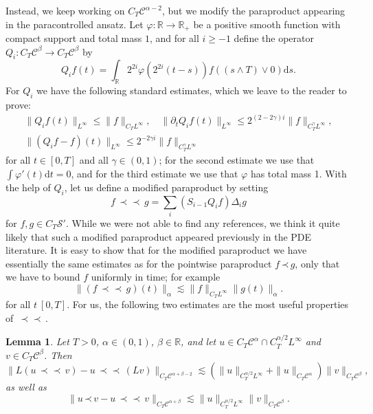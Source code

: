 \documentclass[a4paper,11pt]{article}
\newcommand{\mathd}{\mathrm{d}}
\newtheorem{lemma}[theorem]{Lemma}
\theoremstyle{remark}
\newcommand{\R}{\mathbb{R}}
\newcommand{\CC}{\ensuremath{\mathscr{C}}}
\newcommand{\CS}{\ensuremath{\mathscr{S}}}
\newcommand{\lpara}{\,\mathord{\prec}\,}
\newcommand{\mpara}{\,\mathord{\prec\!\!\!\prec}\,}
\begin{document}
Instead, we keep working on $C_{T} \CC^{\alpha -2}$, but we modify the paraproduct
appearing in the paracontrolled ansatz. Let $\varphi \colon \mathbb{R} \rightarrow \mathbb{R}_{+}$ be a positive smooth function with compact support and total
mass $1$, and for all $i \geqslant -1$ define the operator $Q_{i} \colon C_{T} \CC^{\beta} \rightarrow C_{T} \CC^{\beta}$ by
\[
   Q_{i} f ( t ) = \int_{\mathbb{R}} 2^{2i} \varphi ( 2^{2i} ( t-s ) ) f ( (s \wedge T ) \vee 0 ) \mathd s.
\]
For $Q_{i}$ we have the following standard estimates, which we leave to the reader to prove:
\begin{gather}\label{eq:Q-bounds}
   \| Q_{i} f ( t ) \|_{L^{\infty}} \leqslant \| f \|_{C_{T} L^{\infty}} , \hspace{1em} \| \partial_{t} Q_{i} f ( t ) \|_{L^{\infty}} \leqslant 2^{( 2-2 \gamma ) i} \| f \|_{C_{T}^{\gamma} L^{\infty}}, \\ \nonumber
   \| ( Q_{i} f-f ) ( t ) \|_{L^{\infty}} \leqslant 2^{-2 \gamma i} \| f \|_{C_{T}^{\gamma} L^{\infty}}
\end{gather}
for all $t \in [ 0,T ]$ and all $\gamma \in ( 0,1 )$; for the second estimate
we use that $\int \varphi' ( t ) \mathd t=0$, and for the third estimate we
use that $\varphi$ has total mass 1.
With the help of $Q_{i}$, let us define a modified paraproduct by setting
\begin{equation}\label{eq:modpara}
   f \mpara g= \sum_{i} ( S_{i-1} Q_{i} f ) \Delta_{i} g
\end{equation}
for $f,g \in C_{T} \CS'$. While we were not able to find any references, we think it quite likely that such a modified paraproduct appeared previously in the PDE literature. It is easy to show that for the modified paraproduct we have
essentially the same estimates as for the pointwise paraproduct $f \lpara g$,
only that we have to bound $f$ uniformly in time; for example
\[
   \| ( f \mpara g ) ( t ) \|_{\alpha} \lesssim \| f \|_{C_{T} L^{\infty}} \| g ( t ) \|_{\alpha} .
\]
for all $t \ [0,T]$. For us, the following two estimates are the most useful properties of $\mpara$.

\begin{lemma}\label{lemma:mod-para-est}
  Let $T>0$, $\alpha \in (0,1)$, $\beta \in \R$, and let $u \in C_{T} \CC^{\alpha} \cap C^{\alpha/2}_T L^\infty$ and $v \in C_T \CC^\beta$. Then
  \begin{equation}\label{eq:mod-para-1}
     \| L(u \mpara v ) - u\mpara (Lv) \|_{C_T\CC^{\alpha+\beta -2}} \lesssim ( \| u \|_{C_{T}^{\alpha /2} L^{\infty}} + \| u \|_{C_{T} \CC^\alpha} ) \| v \|_{C_T\CC^\beta},
  \end{equation}
  as well as
  \begin{equation}\label{eq:paraproduct difference}
     \|u \lpara v - u \mpara v\|_{C_T\CC^{\alpha+\beta}} \lesssim \| u \|_{C_{T}^{\alpha /2} L^{\infty}} \| v \|_{C_T\CC^\beta}.
  \end{equation}
\end{lemma}
\end{document}
